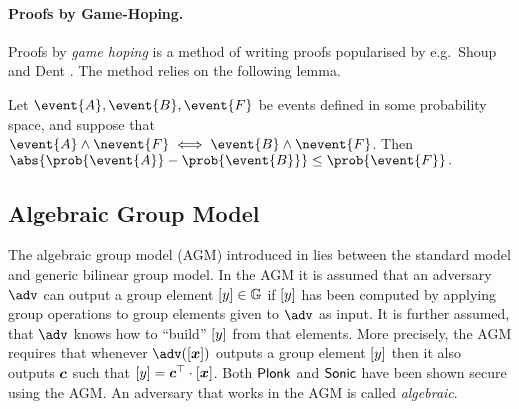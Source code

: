 \documentclass[runningheads,11pt]{llncs}
\let\spvec\vec
\let\vec\accentvec
\let\spvec\vec
\let\vec\spvec
\def\vec#1{\mathchoice{\mbox{\boldmath$\displaystyle#1$}}
  {\mbox{\boldmath$\textstyle#1$}} {\mbox{\boldmath$\scriptstyle#1$}}
  {\mbox{\boldmath$\scriptscriptstyle#1$}}}
\begin{document}

\paragraph{Proofs by Game-Hoping.}
Proofs by \emph{game hoping} is a method of writing proofs popularised by
e.g.~Shoup \cite{EPRINT:Shoup04} and Dent \cite{EPRINT:Dent06c}. The method
relies on the following lemma.

\begin{lemma}
	\label{lem:difference_lemma}
	Let $\event{A}, \event{B}, \event{F}$ be events defined in some probability
	space, and suppose that $\event{A} \land \nevent{F} \iff \event{B}
		\land \nevent{F}$.  Then 
	$
		\abs{\prob{\event{A}} - \prob{\event{B}}} \leq \prob{\event{F}}\,.
	$
\end{lemma}
\subsection{Algebraic Group Model}
The algebraic group model (AGM) introduced in \cite{C:FucKilLos18} lies between
the standard model and generic bilinear group model. In the AGM it is assumed
that an adversary $\adv$ can output a group element $\left[y\right] \in \mathbb{G}$ if
$\left[y\right]$ has been computed by applying group operations to group elements
given to $\adv$ as input. It is further assumed, that $\adv$ knows how to
``build'' $\left[y\right]$ from that elements. More precisely, the AGM requires that
whenever $\adv(\gnone{\vec{x}})$ outputs a group element $\left[y\right]$ then it
also outputs $\vec{c}$ such that $\gnone{y} = \vec{c}^\top \cdot
\gnone{\vec{x}}$. Both $\textnormal{\textsf{Plonk}}$ and ${\textnormal{\textsf{Sonic}}}$ have been shown secure using the
AGM. An adversary that works in the AGM is called \emph{algebraic}.
\end{document}

